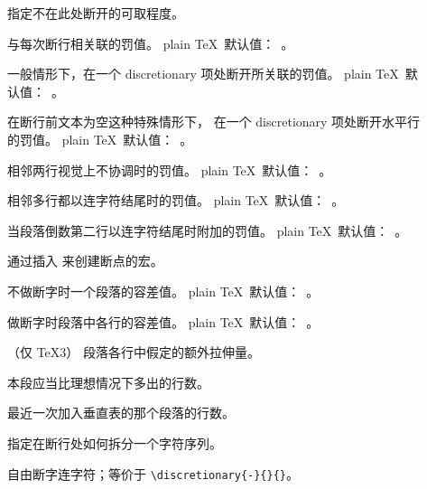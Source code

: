 \documentclass[a4paper]{rapport3}
\newenvironment{inventory}{\begin{description}}{\end{description}}
\begin{document}
\begin{inventory} 
\item [] 
      指定不在此处断开的可取程度。

\item [] 
      与每次断行相关联的罚值。
      plain \TeX\ 默认值：~。

\item [] 
      一般情形下，在一个 discretionary 项处断开所关联的罚值。
      plain \TeX\ 默认值：~。

\item [] 
      在断行前文本为空这种特殊情形下，
      在一个 discretionary 项处断开水平行的罚值。
      plain \TeX\ 默认值：~。

\item [] 
      相邻两行视觉上不协调时的罚值。
      plain \TeX\ 默认值：~。

\item [] 
      相邻多行都以连字符结尾时的罚值。
      plain \TeX\ 默认值：~。

\item [] 
      当段落倒数第二行以连字符结尾时附加的罚值。
      plain \TeX\ 默认值：~。

\item [] 
      通过插入  来创建断点的宏。

\item [] 
      不做断字时一个段落的容差值。
      plain \TeX\ 默认值：~。

\item [] 
      做断字时段落中各行的容差值。
      plain \TeX\ 默认值：~。

\item []
      （仅 \TeX3）
      段落各行中假定的额外拉伸量。

\item []  
      本段应当比理想情况下多出的行数。

\item []  
      最近一次加入垂直表的那个段落的行数。

\item [] 
      指定在断行处如何拆分一个字符序列。

\item [\cs{-}] 
      自由断字连字符；等价于 \verb|\discretionary{-}{}{}|。


\end{inventory}
\end{document}

